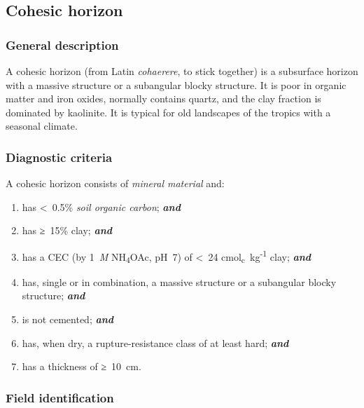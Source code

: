 \documentclass[
  letterpaper,
  DIV=11,
  numbers=noendperiod]{scrreprt}
\providecommand{\tightlist}{%
  \setlength{\itemsep}{0pt}\setlength{\parskip}{0pt}}\usepackage{longtable,booktabs,array}
\begin{document}
\hypertarget{cohesic-horizon}{%
\subsection{Cohesic horizon}\label{cohesic-horizon}}

\hypertarget{general-description-6}{%
\subsubsection{General description}\label{general-description-6}}

A cohesic horizon (from Latin \emph{cohaerere}, to stick together) is a
subsurface horizon with a massive structure or a subangular blocky
structure. It is poor in organic matter and iron oxides, normally
contains quartz, and the clay fraction is dominated by kaolinite. It is
typical for old landscapes of the tropics with a seasonal climate.

\hypertarget{diagnostic-criteria-6}{%
\subsubsection{Diagnostic criteria}\label{diagnostic-criteria-6}}

A cohesic horizon consists of \emph{mineral material} and:

\begin{enumerate}
\def\labelenumi{\arabic{enumi}.}
\tightlist
\item
  has \textless~0.5\% \emph{soil organic carbon}; \textbf{\emph{and}}
\item
  has ≥~15\% clay; \textbf{\emph{and}}
\item
  has a CEC (by 1~\emph{M} NH\textsubscript{4}OAc, pH~7) of \textless~24
  cmol\textsubscript{c}~kg\textsuperscript{-1} clay; \textbf{\emph{and}}
\item
  has, single or in combination, a massive structure or a subangular
  blocky structure; \textbf{\emph{and}}
\item
  is not cemented; \textbf{\emph{and}}
\item
  has, when dry, a rupture-resistance class of at least hard;
  \textbf{\emph{and}}
\item
  has a thickness of ≥~10~cm.
\end{enumerate}

\hypertarget{field-identification-4}{%
\subsubsection{Field identification}\label{field-identification-4}}
\end{document}
